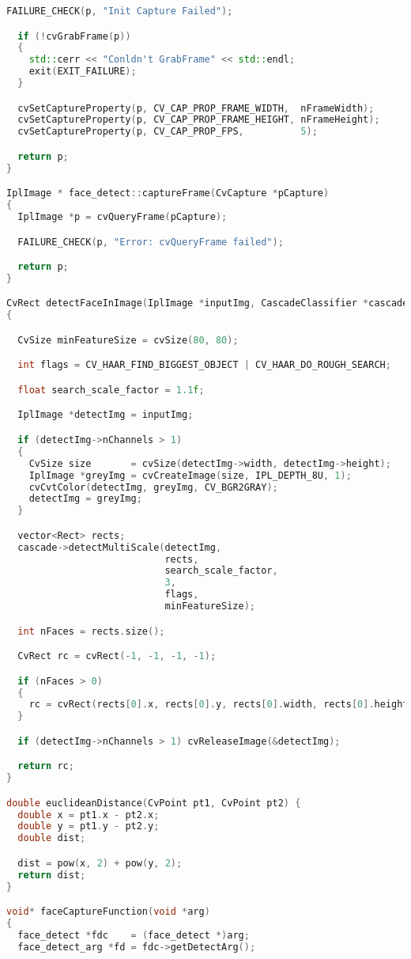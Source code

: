 \begin{lstlisting}[caption=face-detect.cpp,language=C++]
  FAILURE_CHECK(p, "Init Capture Failed");

  if (!cvGrabFrame(p))
  {
    std::cerr << "Conldn't GrabFrame" << std::endl;
    exit(EXIT_FAILURE);
  }

  cvSetCaptureProperty(p, CV_CAP_PROP_FRAME_WIDTH,  nFrameWidth);
  cvSetCaptureProperty(p, CV_CAP_PROP_FRAME_HEIGHT, nFrameHeight);
  cvSetCaptureProperty(p, CV_CAP_PROP_FPS,          5);

  return p;
}

IplImage * face_detect::captureFrame(CvCapture *pCapture)
{
  IplImage *p = cvQueryFrame(pCapture);

  FAILURE_CHECK(p, "Error: cvQueryFrame failed");

  return p;
}

CvRect detectFaceInImage(IplImage *inputImg, CascadeClassifier *cascade)
{

  CvSize minFeatureSize = cvSize(80, 80);

  int flags = CV_HAAR_FIND_BIGGEST_OBJECT | CV_HAAR_DO_ROUGH_SEARCH;

  float search_scale_factor = 1.1f;

  IplImage *detectImg = inputImg;

  if (detectImg->nChannels > 1)
  {
    CvSize size       = cvSize(detectImg->width, detectImg->height);
    IplImage *greyImg = cvCreateImage(size, IPL_DEPTH_8U, 1);
    cvCvtColor(detectImg, greyImg, CV_BGR2GRAY);
    detectImg = greyImg;
  }

  vector<Rect> rects;
  cascade->detectMultiScale(detectImg,
                            rects,
                            search_scale_factor,
                            3,
                            flags,
                            minFeatureSize);

  int nFaces = rects.size();

  CvRect rc = cvRect(-1, -1, -1, -1);

  if (nFaces > 0)
  {
    rc = cvRect(rects[0].x, rects[0].y, rects[0].width, rects[0].height);
  }

  if (detectImg->nChannels > 1) cvReleaseImage(&detectImg);

  return rc;
}

double euclideanDistance(CvPoint pt1, CvPoint pt2) {
  double x = pt1.x - pt2.x;
  double y = pt1.y - pt2.y;
  double dist;

  dist = pow(x, 2) + pow(y, 2);
  return dist;
}

void* faceCaptureFunction(void *arg)
{
  face_detect *fdc    = (face_detect *)arg;
  face_detect_arg *fd = fdc->getDetectArg();


\end{lstlisting}
